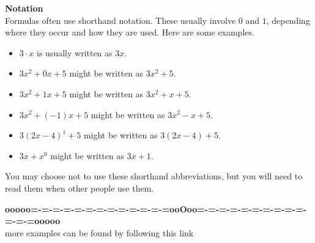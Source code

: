 \documentclass{ximera}
\begin{document}
\begin{warning} \textbf{\textcolor{red!90!darkgray}{Notation}}  \\


Formulas often use shorthand notation.  These usually involve $0$ and $1$, depending where they occur and how they are used.  Here are some examples.


\begin{itemize}
\item $3 \cdot x$ is usually written as $3x$.
\item $3x^2 + 0 x + 5$  might be written as $3x^2 + 5$.
\item $3x^2 + 1 x + 5$  might be written as $3x^2 + x + 5$.
\item $3x^2 + (-1) x + 5$  might be written as $3x^2 - x + 5$.
\item $3(2x-4)^1 + 5$  might be written as $3(2x-4) + 5$.
\item $3x + x^0$  might be written as $3x + 1$.
\end{itemize}


You may choose not to use these shorthand abbreviations, but you will need to read them when other people use them.

\end{warning}

















\begin{center}
\textbf{\textcolor{green!50!black}{ooooo=-=-=-=-=-=-=-=-=-=-=-=-=ooOoo=-=-=-=-=-=-=-=-=-=-=-=-=ooooo}} \\

more examples can be found by following this link\\ 

\end{center}
\end{document}
